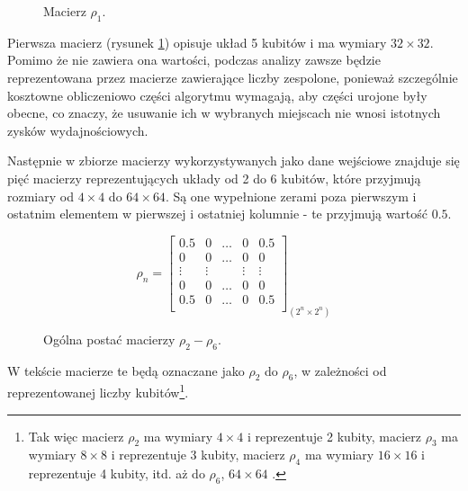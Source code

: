 \documentclass[11pt, a4paper]{article}
\begin{document}
\begin{sloppypar}
    \FloatBarrier
    \begin{figure}[ht]
      \centering
      \setcounter{MaxMatrixCols}{33}
      
      \caption{Macierz $\rho_{1}$.}
      \label{rho-1}
    \end{figure}

    \FloatBarrier

    Pierwsza macierz (rysunek \ref{rho-1}) opisuje układ 5 kubitów i ma wymiary $32\times
    32$. Pomimo że nie zawiera ona wartości, podczas analizy zawsze będzie reprezentowana
    przez macierze zawierające liczby zespolone, ponieważ szczególnie kosztowne
    obliczeniowo części algorytmu wymagają, aby części urojone były obecne, co znaczy, że
    usuwanie ich w wybranych miejscach nie wnosi istotnych zysków wydajnościowych.

    Następnie w zbiorze macierzy wykorzystywanych jako dane wejściowe znajduje się pięć macierzy
    reprezentujących układy od 2 do 6 kubitów, które przyjmują rozmiary od $4\times 4$
    do $64\times64$. Są one wypełnione zerami poza pierwszym i ostatnim elementem w pierwszej
    i ostatniej kolumnie - te przyjmują wartość $0.5$.

    \FloatBarrier
    \begin{figure}[ht]
      \centering
      \setcounter{MaxMatrixCols}{33}
      \[
        \rho_{n}=
        \begin{bmatrix}
          0.5    & 0      & \hdots & 0      & 0.5    \\
          0      & 0      & \hdots & 0      & 0      \\
          \vdots & \vdots &        & \vdots & \vdots \\
          0      & 0      & \hdots & 0      & 0      \\
          0.5    & 0      & \hdots & 0      & 0.5    \\
        \end{bmatrix}_{(2^{n}\times2^{n})}
      \]
      \caption{Ogólna postać macierzy $\rho_{2}- \rho_{6}$.}
      \label{rho-2-6}
    \end{figure}

    \FloatBarrier

    W tekście macierze te będą oznaczane jako $\rho_{2}$ do $\rho_{6}$, w zależności od
    reprezentowanej liczby kubitów\footnote{Tak więc macierz $\rho_{2}$ ma wymiary $4\times
    4$ i reprezentuje 2 kubity, macierz $\rho_{3}$ ma wymiary $8\times8$ i reprezentuje
    3 kubity, macierz $\rho_{4}$ ma wymiary $16\times16$ i reprezentuje 4 kubity, itd. aż
    do $\rho_{6}$, $64\times64$ .}.


\end{sloppypar}
\end{document}
